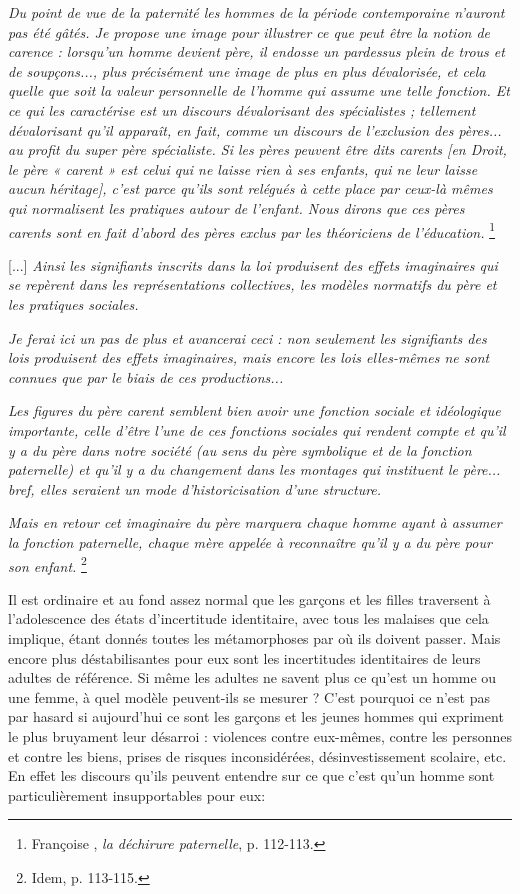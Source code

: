 \begin{displayquote} 
\emph{Du point de vue de la paternité les hommes de la période contemporaine n'auront pas été gâtés. Je propose une image pour illustrer ce que peut être la notion de carence : lorsqu'un homme devient père, il endosse un pardessus plein de trous et de soupçons..., plus précisément une image de plus en plus dévalorisée, et cela quelle que soit la valeur personnelle de l'homme qui assume une telle fonction. Et ce qui les caractérise est un discours dévalorisant des spécialistes ; tellement dévalorisant qu'il apparaît, en fait, comme un discours de l'exclusion des pères... au profit du super père spécialiste. Si les pères peuvent être dits carents \emph{[en Droit, le père « carent » est celui qui ne laisse rien à ses enfants, qui ne leur laisse aucun héritage]}, c'est parce qu'ils sont relégués à cette place par ceux-là mêmes qui normalisent les pratiques autour de l'enfant. Nous dirons que ces pères carents sont en fait d'abord des pères exclus par les théoriciens de l'éducation.}%
\footnote{Françoise , \emph{la déchirure paternelle}, p. 112-113.} 

[...] \emph{Ainsi les signifiants inscrits dans la loi produisent des effets imaginaires qui se repèrent dans les représentations collectives, les modèles normatifs du père et les pratiques sociales.} 

\emph{Je ferai ici un pas de plus et avancerai ceci : non seulement les signifiants des lois produisent des effets imaginaires, mais encore les lois elles-mêmes ne sont connues que par le biais de ces productions...}

\emph{Les figures du père carent semblent bien avoir une fonction sociale et idéologique importante, celle d'être l'une de ces fonctions sociales qui rendent compte et qu'il y a du père dans notre société (au sens du père symbolique et de la fonction paternelle) et qu'il y a du changement dans les montages qui instituent le père... bref, elles seraient un mode d'historicisation d'une structure.}

\emph{Mais en retour cet imaginaire du père marquera chaque homme ayant à assumer la fonction paternelle, chaque mère appelée à reconnaître qu'il y a du père pour son enfant.}%
\footnote{Idem, p. 113-115.}
\end{displayquote}

 Il est ordinaire et au fond assez normal que les garçons et les filles traversent à l'adolescence des états d'incertitude identitaire, avec tous les malaises que cela implique, étant donnés toutes les métamorphoses par où ils doivent passer. Mais encore plus déstabilisantes pour eux sont les incertitudes identitaires de leurs adultes de référence. Si même les adultes ne savent plus ce qu'est un homme ou une femme, à quel modèle peuvent-ils se mesurer ? C'est pourquoi ce n'est pas par hasard si aujourd'hui ce sont les garçons et les jeunes hommes qui expriment le plus bruyament leur désarroi : violences contre eux-mêmes, contre les personnes et contre les biens, prises de risques inconsidérées, désinvestissement scolaire, etc. En effet les discours qu'ils peuvent entendre sur ce que c'est qu'un homme sont particulièrement insupportables pour eux: 
 
